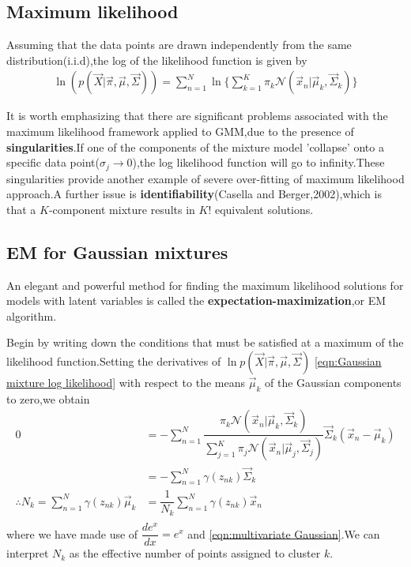 \subsection{Maximum likelihood}
Assuming that the data points are drawn independently from the same distribution(i.i.d),the log of the likelihood function is given by
\begin{align}\label{eqn:Gaussian mixture log likelihood}
\ln(p(\vec{X}|\vec{\pi},\vec{\mu},\vec{\Sigma})) =
\sum_{n=1}^{N}\ln\{\sum_{k=1}^{K}\pi_k\mathcal{N}(\vec{x}_n|\vec{\mu}_k,\vec{\Sigma}_k) \}
\end{align}

It is worth emphasizing that there are significant problems associated with the maximum likelihood framework applied to GMM,due to the presence of \textbf{singularities}.If one of the components of the mixture model 'collapse' onto a specific data point($\sigma_j\rightarrow 0$),the log likelihood function will go to infinity.These singularities provide another example of severe over-fitting of maximum likelihood approach.A further issue is \textbf{identifiability}(Casella and Berger,2002),which is that a $K$-component mixture results in $K!$ equivalent solutions.

\subsection{EM for Gaussian mixtures}
An elegant and powerful method for finding the maximum likelihood solutions for models with latent variables is called the \textbf{expectation-maximization},or EM algorithm.

Begin by writing down the conditions that must be satisfied at a maximum of the likelihood function.Setting the derivatives of $\ln p(\vec{X}|\vec{\pi},\vec{\mu},\vec{\Sigma})$ \ref{eqn:Gaussian mixture log likelihood} with respect to the means $\vec{\mu}_k$ of the Gaussian components to zero,we obtain
\begin{align}
0&=-\sum_{n=1}^{N}\dfrac{\pi_k\mathcal{N}(\vec{x}_n|\vec{\mu}_k,\vec{\Sigma}_k)}
{\sum_{j=1}^{K}\pi_j\mathcal{N}(\vec{x}_n|\vec{\mu}_j,\vec{\Sigma}_j)}
\vec{\Sigma}_k(\vec{x}_n-\vec{\mu}_k) \\
&=-\sum_{n=1}^{N}\gamma(z_{nk})\vec{\Sigma}_k \\
\therefore
N_k=\sum_{n=1}^{N}\gamma(z_{nk})
 \vec{\mu}_k&=\dfrac{1}{N_k}\sum_{n=1}^{N}\gamma(z_{nk})\vec{x}_n \\
\end{align}
where we have made use of $\dfrac{de^x}{dx}=e^x$ and \ref{eqn:multivariate Gaussian}.We can interpret $N_k$ as the effective number of points assigned to cluster $k$.

